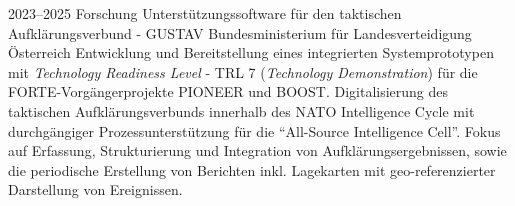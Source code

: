 \cventry
{2023--2025}
{Forschung}
{Unterstützungssoftware für den taktischen Aufklärungsverbund - GUSTAV}
{Bundesministerium für Landesverteidigung}
{Österreich}
{
  Entwicklung und Bereitstellung eines integrierten Systemprototypen mit
  \emph{Technology Readiness Level} - TRL 7 (\emph{Technology Demonstration}) für
  die FORTE-Vorgängerprojekte PIONEER und BOOST.
  Digitalisierung des taktischen Aufklärungsverbunds innerhalb des NATO Intelligence Cycle
  mit durchgängiger Prozessunterstützung für die ``All-Source Intelligence Cell''.
  Fokus auf Erfassung, Strukturierung und Integration von Aufklärungsergebnissen, sowie die periodische Erstellung
  von Berichten inkl. Lagekarten mit geo-referenzierter Darstellung von Ereignissen.
}
